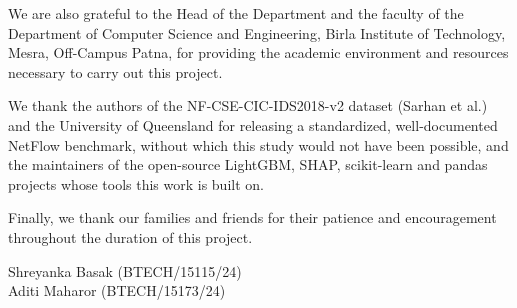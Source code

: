 \documentclass[12pt,a4paper]{report}
\begin{document}
We are also grateful to the Head of the Department and the faculty of the Department of Computer Science and Engineering, Birla Institute of Technology, Mesra, Off-Campus Patna, for providing the academic environment and resources necessary to carry out this project.

We thank the authors of the NF-CSE-CIC-IDS2018-v2 dataset (Sarhan et al.) and the University of Queensland for releasing a standardized, well-documented NetFlow benchmark, without which this study would not have been possible, and the maintainers of the open-source LightGBM, SHAP, scikit-learn and pandas projects whose tools this work is built on.

Finally, we thank our families and friends for their patience and encouragement throughout the duration of this project.


\vspace{1cm}
\begin{flushright}
Shreyanka Basak (BTECH/15115/24)\\
Aditi Maharor (BTECH/15173/24)
\end{flushright}

\tableofcontents
\listoffigures
\listoftables
\end{document}
